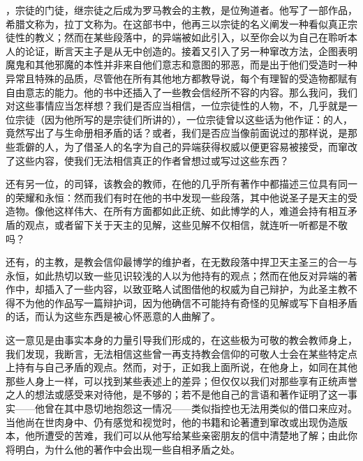 ，宗徒的门徒，继宗徒之后成为罗马教会的主教，是位殉道者。他写了一部作品，希腊文称为，拉丁文称为。在这部书中，他再三以宗徒的名义阐发一种看似真正宗徒性的教义；然而在某些段落中，的异端被如此引入，以至你会以为自己在聆听本人的论证，断言天主子是从无中创造的。接着又引入了另一种窜改方法，企图表明魔鬼和其他邪魔的本性并非来自他们意志和意图的邪恶，而是出于他们受造时一种异常且特殊的品质，尽管他在所有其他地方都教导说，每个有理智的受造物都赋有自由意志的能力。他的书中还插入了一些教会信经所不容的内容。那么我问，我们对这些事情应当怎样想？我们是否应当相信，一位宗徒性的人物，不，几乎就是一位宗徒（因为他所写的是宗徒们所讲的），一位宗徒曾以这些话为他作证：的人，竟然写出了与生命册相矛盾的话？或者，我们是否应当像前面说过的那样说，是那些乖僻的人，为了借圣人的名字为自己的异端获得权威以便更容易被接受，而窜改了这些内容，使我们无法相信真正的作者曾想过或写过这些东西？\par

还有另一位，的司铎，该教会的教师，在他的几乎所有著作中都描述三位具有同一的荣耀和永恒：然而我们有时在他的书中发现一些段落，其中他说圣子是天主的受造物。像他这样伟大、在所有方面都如此正统、如此博学的人，难道会持有相互矛盾的观点，或者留下关于天主的见解，这些见解不仅相信，就连听一听都是不敬吗？\par

还有，的主教，是教会信仰最博学的维护者，在无数段落中捍卫天主圣三的合一与永恒，如此热切以致一些见识较浅的人以为他持有的观点；然而在他反对异端的著作中，却插入了一些内容，以致亚略人试图借他的权威为自己辩护，为此圣主教不得不为他的作品写一篇辩护词，因为他确信不可能持有奇怪的见解或写下自相矛盾的话，而认为这些东西是被心怀恶意的人曲解了。\par

这一意见是由事实本身的力量引导我们形成的，在这些极为可敬的教会教师身上，我们发现，我断言，无法相信这些曾一再支持教会信仰的可敬人士会在某些特定点上持有与自己矛盾的观点。然而，对于，正如我上面所说，在他身上，如同在其他那些人身上一样，可以找到某些表述上的差异；但仅仅以我们对那些享有正统声誉之人的想法或感受来对待他，是不够的；若不是他自己的言语和著作证明了这一事实——他曾在其中恳切地抱怨这一情况——类似指控也无法用类似的借口来应对。当他尚在世肉身中、仍有感觉和视觉时，他的书籍和论著遭到窜改或出现伪造版本，他所遭受的苦难，我们可以从他写给某些亲密朋友的信中清楚地了解；由此你将明白，为什么他的著作中会出现一些自相矛盾之处。\par

